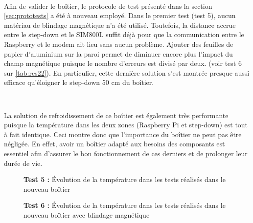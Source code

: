 ~

\noindent
Afin de valider le boîtier, le protocole de test présenté dans la section \ref{sec:prototests} a été à nouveau employé. Dans le premier test (test 5), aucun matériau de blindage magnétique n'a été utilisé. Toutefois, la distance accrue entre le step-down et le SIM800L suffit déjà pour que la communication entre le Raspberry et le modem ait lieu sans aucun problème. Ajouter des feuilles de papier d'aluminium sur la paroi permet de diminuer encore plus l'impact du champ magnétique puisque le nombre d'erreurs est divisé par deux. (voir test 6 sur \ref{tab:res22}). En particulier, cette dernière solution s'est montrée presque aussi efficace qu'éloigner le step-down 50 cm du boîtier.

~

\noindent
La solution de refroidissement de ce boîtier est également très performante puisque la température dans les deux zones (Raspberry Pi et step-down) est tout à fait identique. Ceci montre donc que l'importance du boîtier ne peut pas être négligée. En effet, avoir un boîtier adapté aux besoins des composants est essentiel afin d'assurer le bon fonctionnement de ces derniers et de prolonger leur durée de vie.


\begin{figure}[ht!]
  \centering
  
  \label{fig:test_5}
  \vspace{-0.2cm}
  \caption{\textbf{Test 5 :} Évolution de la température dans les tests réalisés dans le nouveau boîtier}
\end{figure}


\begin{figure}[ht!]
  \centering
  
  \label{fig:test_6}
  \vspace{-1cm}
  \caption{\textbf{Test 6 :} Évolution de la température dans les tests réalisés dans le nouveau boîtier avec blindage magnétique}
\end{figure}


